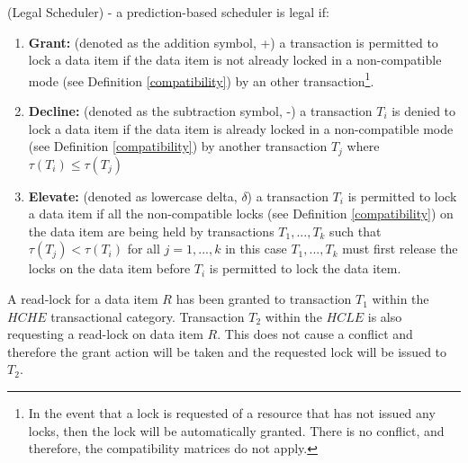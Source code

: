 \begin{definition}
\label{legal_scheduler}
 (Legal Scheduler) - a prediction-based scheduler is legal if:
 
 \begin{enumerate}
    \item \textbf{Grant:} (denoted as the addition symbol, +) a transaction is permitted to lock a data item if the data item is not already locked in a non-compatible mode (see Definition \ref{compatibility}) by an other transaction\footnote{In the event that a lock is requested of a resource that has not issued any locks, then the lock will be automatically granted. There is no conflict, and therefore, the compatibility matrices do not apply.}.
    \item \textbf{Decline:} (denoted as the subtraction symbol, -) a transaction $T_{i}$ is denied to lock a data item if the data item is already locked in a non-compatible mode (see Definition \ref{compatibility}) by another transaction $T_{j}$ where $\tau(T_{i}) \le \tau(T_{j})$
    \item \textbf{Elevate:} (denoted as lowercase delta, $\delta$) a transaction $T_{i}$ is permitted to lock a data item if all the non-compatible locks (see Definition \ref{compatibility}) on the data item are being held by transactions $T_{1}, ... , T_{k}$ such that $\tau(T_{j}) < \tau(T_{i})$ for all $j = 1, ..., k$ in this case $T_{1}, ... , T_{k}$ must first release the locks on the data item before $T_{i}$ is permitted to lock the data item.
 \end{enumerate}

 
 \begin{example}
 \label{ex_grant_action}
  A read-lock for a data item $R$ has been granted to transaction $T_{1}$ within the $HCHE$ transactional category. Transaction $T_{2}$ within the $HCLE$ is also requesting a read-lock on data item $R$. This does not cause a conflict and therefore the grant action will be taken and the requested lock will be issued to $T_{2}$.
 \end{example}
 

\end{definition}

